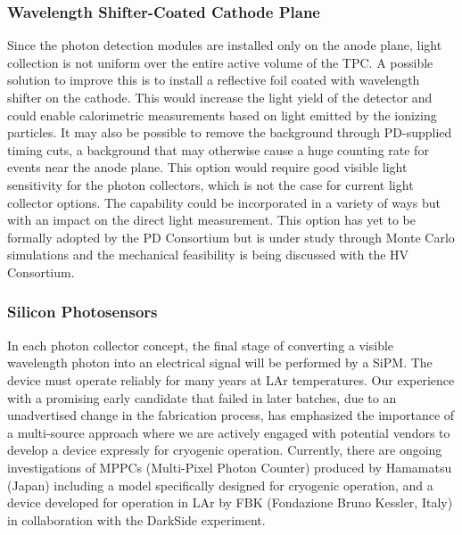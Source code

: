 \subsubsection{Wavelength Shifter-Coated Cathode Plane} 
Since the photon detection modules are installed only on the anode plane, light collection is not uniform over the entire active volume of the TPC. A possible solution to improve this is to install a reflective foil coated with wavelength shifter on the cathode.
This would increase the light yield of the detector and could enable calorimetric measurements based on light emitted by the ionizing particles. It may also be possible to remove the  background through PD-supplied timing cuts, a background that may otherwise cause a huge counting rate for events near the anode plane. This option would require good visible light sensitivity for the photon collectors, which is not the case for current light collector options. The capability could be incorporated in a variety of ways but with an impact on the direct light measurement. This option has yet to be formally adopted by the PD Consortium but is under study through Monte Carlo simulations and the mechanical feasibility is being discussed with the HV Consortium.

\subsubsection{Silicon Photosensors} 
In each photon collector concept, the final stage of converting a visible wavelength photon into an electrical signal will be performed by a SiPM. The device must operate reliably for many years at LAr temperatures.
Our experience with a promising early candidate that failed in later batches, due to an unadvertised change in the fabrication process, has emphasized the importance of a multi-source approach where we are actively engaged with potential vendors to develop a device expressly for cryogenic operation. Currently, there are ongoing investigations of MPPCs (Multi-Pixel Photon Counter) produced by Hamamatsu (Japan) including a model specifically designed for cryogenic operation, and a device developed for operation in LAr by FBK (Fondazione Bruno Kessler, Italy) in collaboration with the DarkSide experiment.

